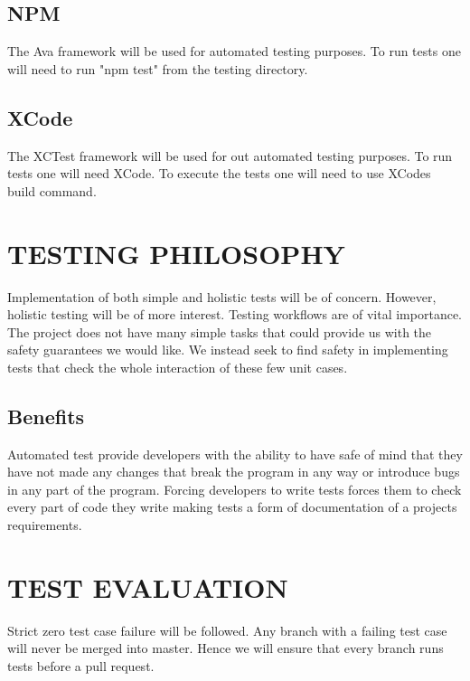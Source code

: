 \documentclass[12pt]{article}
\begin{document}
  \subsection{NPM}
  The Ava framework will be used for automated testing purposes. To run tests one will need to run "npm test" from the testing directory.
  \subsection{XCode}
  The XCTest framework will be used for out automated testing purposes. To run tests one will need XCode. To execute the tests one will need to use XCodes build command.
 
  \section{TESTING PHILOSOPHY}
  Implementation of both simple and holistic tests will be of concern. However, holistic testing will be of more interest. Testing workflows are of vital importance. The project does not have many simple tasks that could provide us with the safety guarantees we would like. We instead seek to find safety in implementing tests that check the whole interaction of these few unit cases.
  
  \subsection{Benefits}
  Automated test provide developers with the ability to have safe of mind that they have not made any changes that break the program in any way or introduce bugs in any part of the program.
  Forcing developers to write tests forces them to check every part of code they write making tests a form of documentation of a projects requirements.
  
  \section{TEST EVALUATION}
  Strict zero test case failure will be followed. Any branch with a failing test case will never be merged into master. Hence we will ensure that every branch runs tests before a pull request.
  
\end{document}
